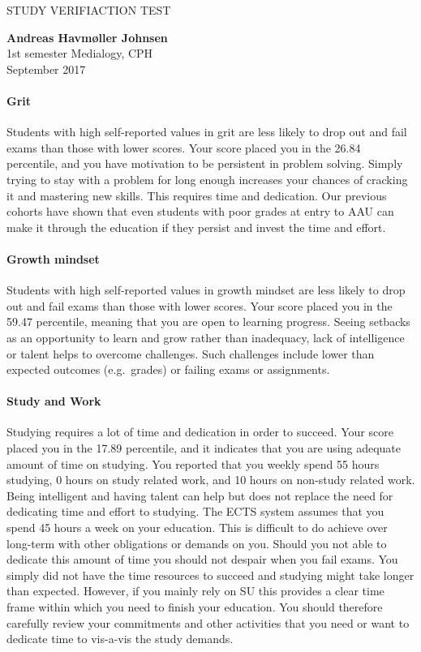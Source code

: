 \documentclass[]{article}
\let\oldparagraph\paragraph
\renewcommand{\paragraph}[1]{\oldparagraph{#1}\mbox{}}
\begin{document}
\pagebreak

STUDY VERIFIACTION TEST

\textbf{Andreas Havmøller Johnsen}\\
1st semester Medialogy, CPH\\
September 2017

\paragraph{Grit}\label{grit}

Students with high self-reported values in grit are less likely to drop
out and fail exams than those with lower scores. Your score placed you
in the 26.84 percentile, and you have motivation to be persistent in
problem solving. Simply trying to stay with a problem for long enough
increases your chances of cracking it and mastering new skills. This
requires time and dedication. Our previous cohorts have shown that even
students with poor grades at entry to AAU can make it through the
education if they persist and invest the time and effort.

\paragraph{Growth mindset}\label{growth-mindset}

Students with high self-reported values in growth mindset are less
likely to drop out and fail exams than those with lower scores. Your
score placed you in the 59.47 percentile, meaning that you are open to
learning progress. Seeing setbacks as an opportunity to learn and grow
rather than inadequacy, lack of intelligence or talent helps to overcome
challenges. Such challenges include lower than expected outcomes
(e.g.~grades) or failing exams or assignments.

\paragraph{Study and Work}\label{study-and-work}

Studying requires a lot of time and dedication in order to succeed. Your
score placed you in the 17.89 percentile, and it indicates that you are
using adequate amount of time on studying. You reported that you weekly
spend 55 hours studying, 0 hours on study related work, and 10 hours on
non-study related work. Being intelligent and having talent can help but
does not replace the need for dedicating time and effort to studying.
The ECTS system assumes that you spend 45 hours a week on your
education. This is difficult to do achieve over long-term with other
obligations or demands on you. Should you not able to dedicate this
amount of time you should not despair when you fail exams. You simply
did not have the time resources to succeed and studying might take
longer than expected. However, if you mainly rely on SU this provides a
clear time frame within which you need to finish your education. You
should therefore carefully review your commitments and other activities
that you need or want to dedicate time to vis-a-vis the study demands.
\end{document}
